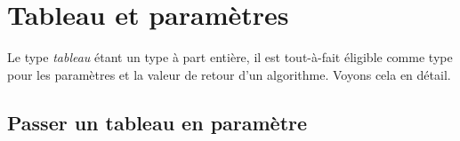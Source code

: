 
	\section{Tableau et paramètres}
	
		Le type \emph{tableau} étant un type à part entière,
		il est tout-à-fait éligible comme type
		pour les paramètres et la valeur de retour d’un algorithme.
		Voyons cela en détail.

		\subsection{Passer un tableau en paramètre}
		
